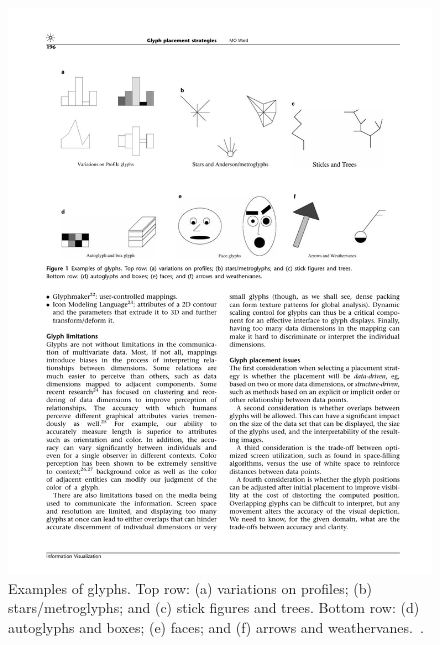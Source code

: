 \begin{itemize}
\begin{figure}[h]
  \begin{center}
    \hspace*{-1cm}\includegraphics[width=1.2\textwidth]{figures/glyphs.pdf}
    \caption{Examples of glyphs. Top row: (a) variations on profiles; (b) stars/metroglyphs; and (c) stick figures and trees.
Bottom row: (d) autoglyphs and boxes; (e) faces; and (f) arrows and weathervanes.~\cite{ward02glyphs}.}
    \label{fig:glyphs-ward}
  \end{center}
\end{figure}


\end{itemize}
